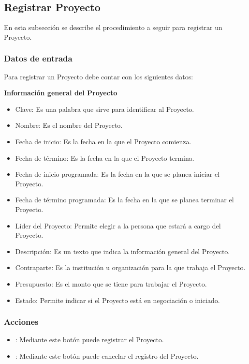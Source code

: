 \subsection{Registrar Proyecto}

En esta subsección se describe el procedimiento a seguir para registrar un Proyecto.


\subsubsection{Datos de entrada}
\begin{description}
	\item Para registrar un Proyecto debe contar con los siguientes datos: \hspace{10pt}
	
	\begin{description}
	    \item \textbf{Información general del Proyecto}
	    \begin{itemize}
		  \item Clave: Es una palabra que sirve para identificar al Proyecto.
		  \item Nombre: Es el nombre del Proyecto.
		  \item Fecha de inicio: Es la fecha en la que el Proyecto comienza.
		  \item Fecha de término: Es la fecha en la que el Proyecto termina.
		  \item Fecha de inicio programada: Es la fecha en la que se planea iniciar el Proyecto.
		  \item Fecha de término programada: Es la fecha en la que se planea terminar el Proyecto.
		  \item Líder del Proyecto: Permite elegir a la persona que estará a cargo del Proyecto.
		  \item Descripción: Es un texto que indica la información general del Proyecto.
		  \item Contraparte: Es la institución u organización para la que trabaja el Proyecto.
		  \item Presupuesto: Es el monto que se tiene para trabajar el Proyecto.
		  \item Estado: Permite indicar si el Proyecto está en negociación o iniciado.
	    \end{itemize}
	 \end{description}
\end{description}

\subsubsection{Acciones}
\begin{itemize}
  \item {}: Mediante este botón puede registrar el Proyecto.
  \item {}: Mediante este botón puede cancelar el registro del Proyecto.
\end{itemize}


